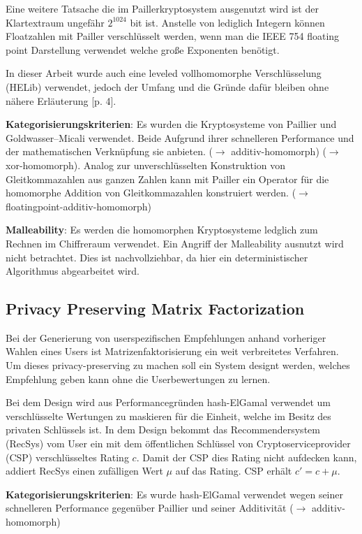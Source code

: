 \documentclass[12pt,a4paper]{scrartcl}				%
\begin{document}
Eine weitere Tatsache die im Paillerkryptosystem ausgenutzt wird ist der Klartextraum ungefähr $2^{1024}$ bit ist. Anstelle von lediglich Integern können Floatzahlen mit Pailler verschlüsselt werden, wenn man die IEEE 754 floating point Darstellung verwendet welche große Exponenten benötigt.

In dieser Arbeit wurde auch eine leveled vollhomomorphe Verschlüsselung (HELib) verwendet, jedoch der Umfang und die Gründe dafür bleiben ohne nähere Erläuterung [p. 4].

\textbf{Kategorisierungskriterien}: Es wurden die Kryptosysteme von Paillier und Goldwasser–Micali verwendet. Beide Aufgrund ihrer schnelleren Performance und der mathematischen Verknüpfung sie anbieten. ($\rightarrow$ additiv-homomorph) ($\rightarrow$ xor-homomorph). Analog zur unverschlüsselten Konstruktion von Gleitkommazahlen aus ganzen Zahlen kann mit  Pailler ein Operator für die homomorphe Addition von Gleitkommazahlen konstruiert werden. ($\rightarrow$ floatingpoint-additiv-homomorph)

\textbf{Malleability}: Es werden die homomorphen Kryptosysteme ledglich zum Rechnen im Chiffreraum verwendet. Ein Angriff der Malleability ausnutzt wird nicht betrachtet. Dies ist nachvollziehbar, da hier ein deterministischer Algorithmus abgearbeitet wird.

\subsection*{Privacy Preserving Matrix Factorization} \cite{nikolaenko2013privacy}
Bei der Generierung von userspezifischen Empfehlungen anhand vorheriger Wahlen eines Users ist Matrizenfaktorisierung ein weit verbreitetes Verfahren. Um dieses privacy-preserving zu machen soll ein System designt werden, welches Empfehlung geben kann ohne die Userbewertungen zu lernen.

Bei dem Design wird aus Performancegründen hash-ElGamal verwendet um verschlüsselte Wertungen zu maskieren für die Einheit, welche im Besitz des privaten Schlüssels ist. In dem Design bekommt das Recommendersystem (RecSys) vom User ein mit dem öffentlichen Schlüssel von Cryptoserviceprovider (CSP) verschlüsseltes Rating $c$. Damit der CSP dies Rating nicht aufdecken kann, addiert RecSys einen zufälligen Wert $\mu$ auf das Rating. CSP erhält $c'=c+\mu$.

\textbf{Kategorisierungskriterien}: Es wurde hash-ElGamal verwendet wegen seiner schnelleren Performance gegenüber Paillier und seiner Additivität ($\rightarrow$ additiv-homomorph)
 
\end{document}
